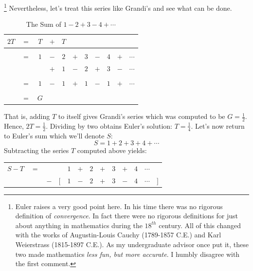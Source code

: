 \begin{example}
        \footnote{%
            Euler raises a very good point here. In his time there was no
            rigorous definition of \textit{convergence}. In fact there were no
            rigorous definitions for just about anything in mathematics during
            the $18^{th}$ century. All of this changed with the works of
            Augustin-Louis Cauchy (1789-1857 C.E.)%
             and Karl Weierstrass
            (1815-1897 C.E.). As my undergraduate
            advisor once put it, these two made mathematics
            \textit{less fun, but more accurate}. I humbly disagree with the
            first comment.
        }
        Nevertheless, let's treat this series like Grandi's and see what can
        be done.
        \begin{table}[H]
            \centering
            \captionsetup{type=table}
            \begin{tabular}{ccccccccccc}
                $2T$&$=$&$T$&$+$&$T$\\
                    \hline\\
                    &$=$&$1$&$-$&$2$&$+$&$3$&$-$&$4$&$+$&$\cdots$\\
                    &   &   &$+$&$1$&$-$&$2$&$+$&$3$&$-$&$\cdots$\\
                \hline\\
                    &$=$&$1$&$-$&$1$&$+$&$1$&$-$&$1$&$+$&$\cdots$\\
                \hline\\
                &$=$&$G$
            \end{tabular}
            \caption{The Sum of $1-2+3-4+\cdots$}
        \end{table}
        That is, adding $T$ to itself gives Grandi's series which was computed
        to be $G=\frac{1}{2}$. Hence, $2T=\frac{1}{2}$. Dividing by two
        obtains Euler's solution: $T=\frac{1}{4}$. Let's now return to Euler's
        sum which we'll denote $S$:
        \begin{equation}
            S=1+2+3+4+\cdots
        \end{equation}
        Subtracting the series $T$ computed above yields:
        \begin{table}[H]
            \centering
            \captionsetup{type=table}
            \begin{tabular}{ccccccccccccc}
                $S-T$&$=$&&       &$1$&$+$&$2$&$+$&$3$&$+$&$4$&$\cdots$\\
                     &&$-$&$\Big[$&$1$&$-$&$2$&$+$&$3$&$-$&$4$&$\cdots$&$\Big]$

\end{tabular}
\end{table}
\end{example}
